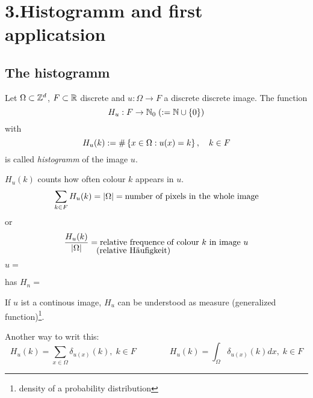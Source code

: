 \chapter{3.Histogramm and first applicatsion}
\section{The histogramm}
%
%
\begin{definition}[histogram]
	Let $\Omega \subset \mathbb{Z}^d$, $F\subset \mathbb{R}$ discrete and 
 	$u: \Omega \to F$ a discrete discrete image. 
 	The function 
 		$$ H_u : F \to \mathbb{N}_0 \; (:= \mathbb{N} \cup \left\{0\right\})$$
 	with 
	$$ H_u (k) := \# \left\{ x\in \Omega: 
		u(x) = k\right\}, \quad k\in F$$
	is called \emph{histogramm} of the image $u$.
\end{definition}

%
%
$H_u(k)$ counts how often colour $k$ appears in $u$.
%
	$$ \sum_{k\in F} H_u (k) = |\Omega| 
		= \hbox{number of pixels in the whole  image}$$
or
%
	$$ {H_u(k) \over |\Omega|} = 
		\hbox{relative frequence$%
			_{\lower0.84em\hbox{\hskip-8.1em (relative Häufigkeit)}}$ 
				 \hskip-.8em \hbox{of colour $k$ in image $u$}} $$

%
%
\newcommand{\pikA}{%
	\begin{minipage}{0.14\linewidth}
		\tikzpictureQNINEONE
	\end{minipage}%
}
\newcommand{\pikB}{%
	\begin{minipage}{0.35\linewidth}
		\tikzpictureQNINETWO
	\end{minipage}%
}

\begin{bsp}
	$u =$ \pikA has $H_n =$ \pikB  
\end{bsp}

If $u$ ist a continous image, $H_u$ can be understood as
measure (generalized function)\footnote{density
of a probability distribution}. 

\newcommand{\underarrow}[2]{%
	\newlength{\widthA}
	\newlength{\widthB}
	\settowidth{\widthA}{#1}
	\settowidth{\widthB}{#2}
	\vbox{1\widthA}{#1\\ \hskip-2em\parbox{\widthB}{$\uparrow$\\#2}}
}
{\small 
	Another way to writ this:
	\[ H_u(k) = \sum_{x\in \Omega} 
	\delta _{u(x)}(k),\;
		k \in F \qquad \qquad
		H_u (k) = \int_{\Omega} \delta_{u(x)}(k) dx, \;
		k\in F\]
}

